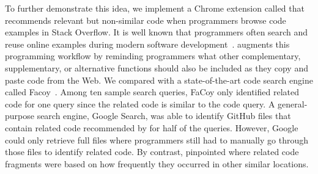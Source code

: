 To further demonstrate this idea, we implement a Chrome extension called {\tool} that recommends relevant but non-similar code when programmers browse code examples in Stack Overflow. It is well known that programmers often search and reuse online examples during modern software development~\cite{brandt2010example, umarji2008archetypal, gallardo2009internet}. {\tool} augments this programming workflow by reminding programmers what other complementary, supplementary, or alternative functions should also be included as they copy and paste code from the Web. We compared {\tool} with a state-of-the-art code search engine called Facoy~\cite{kim2018Facoy}. Among ten sample search queries, FaCoy only identified related code for one query since the related code is similar to the code query. A general-purpose search engine, Google Search, was able to identify GitHub files that contain related code recommended by {\tool}  for half of the queries. However, Google could only retrieve full files where programmers still had to manually go through those files to identify related code. By contrast, {\tool} pinpointed where related code fragments were based on how frequently they occurred in other similar locations.



